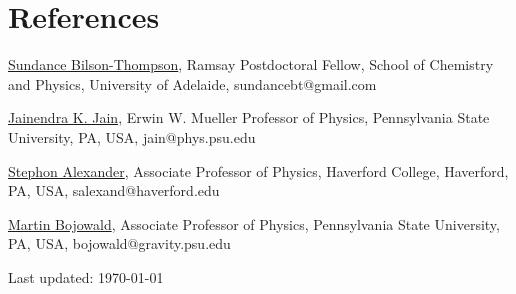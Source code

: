 \documentclass[letterpaper]{article}
\def\footerlink{}
\renewenvironment{itemize}{
  \begin{list}{}{
    \setlength{\leftmargin}{1.5em}
  }
}{
  \end{list}
}
\begin{document}
\section*{References}

\begin{itemize}
	\item \href{http://www.adelaide.edu.au/directory/sundance.bilson-thompson}{Sundance Bilson-Thompson}, Ramsay Postdoctoral Fellow, School of Chemistry and Physics, University of Adelaide, sundancebt@gmail.com
	\item \href{http://www.phys.psu.edu/~jain/}{Jainendra K. Jain}, Erwin W. Mueller Professor of Physics, Pennsylvania State University, PA, USA, jain@phys.psu.edu
	\item \href{http://www.haverford.edu/faculty/salexand}{Stephon Alexander}, Associate Professor of Physics, Haverford College, Haverford, PA, USA, salexand@haverford.edu
	\item \href{http://www.phys.psu.edu/people/display/index.html?person_id=417}{Martin Bojowald}, Associate Professor of Physics, Pennsylvania State University, PA, USA, bojowald@gravity.psu.edu
\end{itemize}

\begin{center}
  \begin{footnotesize}
    Last updated: \today \\
    \href{\footerlink}{\texttt{\footerlink}}
  \end{footnotesize}
\end{center}
\end{document}
